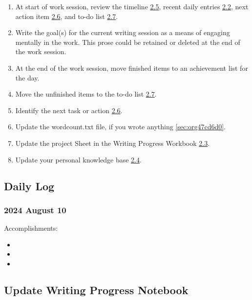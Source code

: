 \documentclass[11pt,letterpaper]{article}
\begin{document}
\begin{enumerate}
\item At start of work session, review the timeline
\hyperref[sec:org7fac2d8]{2.5}, recent daily entries
\hyperref[sec:org1ab81e4]{2.2}, next action item \hyperref[sec:org4a1462e]{2.6}, and
to-do list \hyperref[sec:orgef56b58]{2.7}.
\item Write the goal(s) for the current writing session as a means of
engaging mentally in the work. This prose could be retained or
deleted at the end of the work session.
\item At the end of the work session, move finished items to an achievement
list for the day.
\item Move the unfinished items to the to-do list \hyperref[sec:orgef56b58]{2.7}.
\item Identify the next task or action \hyperref[sec:org4a1462e]{2.6}.
\item Update the wordcount.txt file, if you wrote anything
\ref{sec:org47cd6d0}.
\item Update the project Sheet in the Writing Progress Workbook
\hyperref[sec:orgc090fa5]{2.3}.
\item Update your personal knowledge base \hyperref[sec:org47cd6d0]{2.4}.
\end{enumerate}

\subsection{Daily Log}
\label{sec:org1ab81e4}



\subsubsection{2024 August 10}
\label{sec:org589db9a}

Accomplishments:

\begin{itemize}
\item 

\item 

\item 
\end{itemize}

\subsection{Update Writing Progress Notebook}
\label{sec:orgc090fa5}
\end{document}
